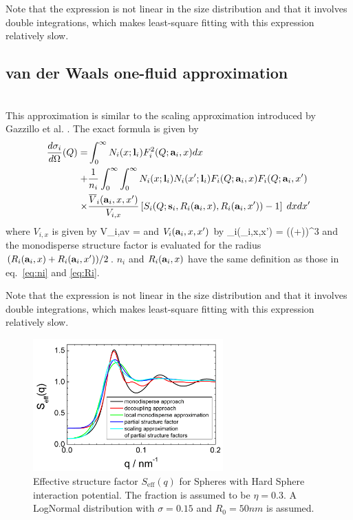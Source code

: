 Note that the expression is not linear in the size distribution
and that it involves double integrations, which makes least-square
fitting with this expression relatively slow.

\subsection{van der Waals one-fluid approximation}
\label{sec:SQvdW1}
~\\
This approximation is similar to the scaling approximation introduced by Gazzillo
et al. \cite{Gazzillo1999}. The exact formula is given by
\begin{align}
\frac{d\sigma_i}{d\Omega}(Q) =
 &\int_0^\infty N_i(x;\B{l}_i) F_i^2(Q;\B{a}_i,x) dx \\
+ & \frac{1}{n_i}\int_0^\infty\int_0^\infty
N_i(x;\B{l}_i) N_i(x';\B{l}_i) F_i(Q;\B{a}_i,x) F_i(Q;\B{a}_i,x') \nonumber \\
\times & \frac{\overline{V}_i(\B{a}_i,x,x')}{V_{i,x}}
\left[S_i(Q;\B{s}_i,R_i(\B{a}_i,x),R_i(\B{a}_i,x'))-1\right] \;dx
dx' \nonumber
\end{align}
where $V_{i,x}$ is given by
\BE
V_{i,av} = 
\EE
and $V_i(\B{a}_i,x,x')$ by
\BE
{}_i(_i,x,x') = \pi \left(\left(+\right)\right)^3
\EE
and the monodisperse structure factor is evaluated for the radius
$(R_i(\B{a}_i,x)+R_i(\B{a}_i,x'))/2$. $n_i$ and $R_i(\B{a}_i,x)$ have the same
definition as those in eq.\ \ref{eq:ni} and \ref{eq:Ri}.

Note that the expression is not linear in the size distribution
and that it involves double integrations, which makes least-square
fitting with this expression relatively slow.



\begin{figure}[htb]
\begin{center}
\includegraphics[width=0.65\textwidth,height=0.5\textwidth]{../images/structure_factor/Seff.png}
\end{center}
\caption{Effective structure factor $S_\text{eff}(q)$ for Spheres with Hard Sphere interaction potential.
The fraction is assumed to be $\eta=0.3$. A LogNormal distribution with $\sigma=0.15$ and $R_0=50nm$
is assumed.}
\label{fig:Seff}
\end{figure}

